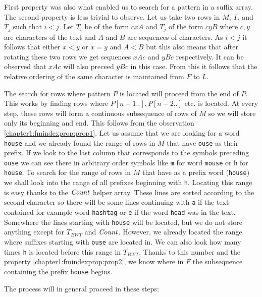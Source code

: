 First property was also what enabled us to search for a pattern in a suffix array.
The second property is less trivial to observe. Let us take two rows in $M$, $T_i$ and $T_j$
such that $i<j$. Let $T_i$ be of the form $cxA$ and $T_j$ of the form $cyB$ where $c, y$ are
characters of the text and $A$ and $B$ are sequences of characters. As $i<j$ it follows that
either $x<y$ or $x=y$ and $A<B$ but this also means that after rotating these two rows we get
sequences $xAc$ and $yBc$ respectively. It can be observed that $xAc$ will also preceed $yBc$
in this case. From this it follows that the relative ordering of the same character is maintained
from $F$ to $L$.

The search for rows where pattern $P$ is located will proceed from the end of $P$. This works by
finding rows where $P[n-1..], P[n-2..]$ etc. is located. At every step, these rows will form a continuous
subsequence of rows of $M$ so we will store only its beginning and end. This follows from the observation
\ref{chapter1:fmindexprop:prop1}. Let us assume that we are
looking for a word {\tt house} and we already found the range of rows in $M$ that have {\tt ouse}
as their prefix. If we look to the last column that corresponds to the symbols preceding {\tt ouse}
we can see there in arbitrary order symbols like {\tt m} for word {\tt mouse} or {\tt h} for
{\tt house}. To search for the range of rows in $M$ that have as a prefix word ({\tt house})
we shall look into the range of all prefixes beginning with {\tt h}. Locating this range is easy
thanks to the $\mathit{Count}$ helper array. These lines are sorted according to the second character so
there will be some lines continuing with {\tt a} if the text contained for example word {\tt hashtag}
or {\tt e} if the word {\tt head} was in the text. Somewhere the lines starting with 
{\tt house} will be located, but we do not store anything except for $T_{BWT}$ and $\mathit{Count}$.
However, we already located the range where suffixes starting with {\tt ouse} are located in.
We can also look how many times {\tt h} is located before this range in $T_{BWT}$. Thanks to this
number and the property \ref{chapter1:fmindexprop:prop2}, we know where in $F$ the subsequence
containing the prefix {\tt house} begins.


The process will in general proceed in these steps:

